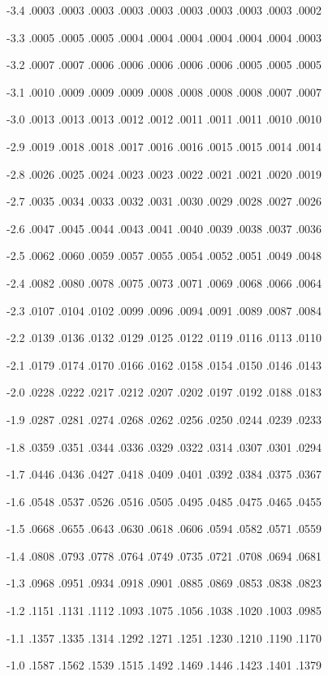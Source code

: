 \documentclass[12pt,fleqn]{article}\usepackage{../common}
\begin{document}
-3.4 .0003 .0003 .0003 .0003 .0003 .0003 .0003 .0003 .0003 .0002

-3.3 .0005 .0005 .0005 .0004 .0004 .0004 .0004 .0004 .0004 .0003

-3.2 .0007 .0007 .0006 .0006 .0006 .0006 .0006 .0005 .0005 .0005

-3.1 .0010 .0009 .0009 .0009 .0008 .0008 .0008 .0008 .0007 .0007

-3.0 .0013 .0013 .0013 .0012 .0012 .0011 .0011 .0011 .0010 .0010

-2.9 .0019 .0018 .0018 .0017 .0016 .0016 .0015 .0015 .0014 .0014

-2.8 .0026 .0025 .0024 .0023 .0023 .0022 .0021 .0021 .0020 .0019

-2.7 .0035 .0034 .0033 .0032 .0031 .0030 .0029 .0028 .0027 .0026

-2.6 .0047 .0045 .0044 .0043 .0041 .0040 .0039 .0038 .0037 .0036

-2.5 .0062 .0060 .0059 .0057 .0055 .0054 .0052 .0051 .0049 .0048

-2.4 .0082 .0080 .0078 .0075 .0073 .0071 .0069 .0068 .0066 .0064

-2.3 .0107 .0104 .0102 .0099 .0096 .0094 .0091 .0089 .0087 .0084

-2.2 .0139 .0136 .0132 .0129 .0125 .0122 .0119 .0116 .0113 .0110

-2.1 .0179 .0174 .0170 .0166 .0162 .0158 .0154 .0150 .0146 .0143

-2.0 .0228 .0222 .0217 .0212 .0207 .0202 .0197 .0192 .0188 .0183

-1.9 .0287 .0281 .0274 .0268 .0262 .0256 .0250 .0244 .0239 .0233

-1.8 .0359 .0351 .0344 .0336 .0329 .0322 .0314 .0307 .0301 .0294

-1.7 .0446 .0436 .0427 .0418 .0409 .0401 .0392 .0384 .0375 .0367

-1.6 .0548 .0537 .0526 .0516 .0505 .0495 .0485 .0475 .0465 .0455

-1.5 .0668 .0655 .0643 .0630 .0618 .0606 .0594 .0582 .0571 .0559

-1.4 .0808 .0793 .0778 .0764 .0749 .0735 .0721 .0708 .0694 .0681

-1.3 .0968 .0951 .0934 .0918 .0901 .0885 .0869 .0853 .0838 .0823

-1.2 .1151 .1131 .1112 .1093 .1075 .1056 .1038 .1020 .1003 .0985

-1.1 .1357 .1335 .1314 .1292 .1271 .1251 .1230 .1210 .1190 .1170

-1.0 .1587 .1562 .1539 .1515 .1492 .1469 .1446 .1423 .1401 .1379
\end{document}
